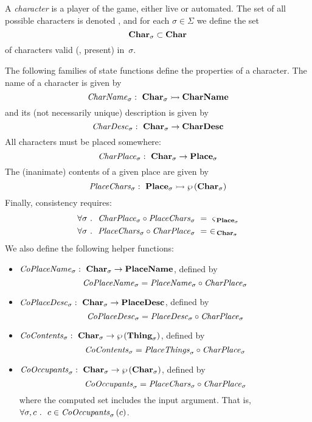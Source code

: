 A {\em character} is a player of the game, either live or automated.
The set of all possible characters is denoted \charset{},
and for each $\sigma \in \Sigma$ we define the set
\[ \textbf{Char}_{\sigma} \subset \textbf{Char}_{} \]
of characters valid (\ie, present) in~$\sigma$.

The following families of
state functions define the properties of a character.
The name of a character is given by
\[ \mathit{CharName}_{\sigma}:~ \textbf{Char}_{\sigma} \rightarrowtail \textbf{CharName} \]
and its (not necessarily unique) description is given by
\[ \mathit{CharDesc}_{\sigma}:~ \textbf{Char}_{\sigma} \rightarrow \textbf{CharDesc} \]
All characters must be placed somewhere:
\[ \mathit{CharPlace}_{\sigma}:~ \textbf{Char}_{\sigma} \rightarrow \textbf{Place}_{\sigma} \]
The (inanimate) contents of a given place are given by
\[ \mathit{PlaceChars}_{\sigma}:~ \textbf{Place}_{\sigma} \rightarrowtail
\wp\left(\textbf{Char}_{\sigma}\right) \]
Finally, consistency requires:
\begin{align*}
  \forall \sigma &~.~~
  \mathit{CharPlace}_{\sigma} \circ \mathit{PlaceChars}_{\sigma} ~=~ \mathit{\varsigma_{\,\textbf{Place}_{\sigma}}} \\
  \forall \sigma &~.~~
  \mathit{PlaceChars}_{\sigma} \circ \mathit{CharPlace}_{\sigma} ~=~ \in_{\,\textbf{Char}_{\sigma}}
\end{align*}
We also define the following helper functions:
\begin{itemize}
\item
$\mathit{CoPlaceName}_{\sigma}:~ \textbf{Char}_{\sigma} \rightarrow \textbf{PlaceName}$,
defined by \[\mathit{CoPlaceName}_{\sigma}
= \mathit{PlaceName}_{\sigma} \circ \mathit{CharPlace}_{\sigma} \]
\item
$\mathit{CoPlaceDesc}_{\sigma}:~ \textbf{Char}_{\sigma} \rightarrow \textbf{PlaceDesc}$,
defined by \[\mathit{CoPlaceDesc}_{\sigma}
= \mathit{PlaceDesc}_{\sigma} \circ \mathit{CharPlace}_{\sigma} \]
\item $\mathit{CoContents}_{\sigma}:~ \textbf{Char}_{\sigma} \rightarrow
  \wp\left(\textbf{Thing}_{\sigma}\right)$, defined by
  \[\mathit{CoContents}_{\sigma} = \mathit{PlaceThings}_{\sigma} \circ \mathit{CharPlace}_{\sigma}\]
\item $\mathit{CoOccupants}_{\sigma}:~ \textbf{Char}_{\sigma} \rightarrow
  \wp\left(\textbf{Char}_{\sigma}\right)$, defined by
  \[\mathit{CoOccupants}_{\sigma} = \mathit{PlaceChars}_{\sigma} \circ \mathit{CharPlace}_{\sigma}\]
where the computed set includes the input argument. That is, $\forall
  \sigma, c ~.~~c \in \mathit{CoOccupants}_{\sigma}\left(c\right)$.
\end{itemize}

